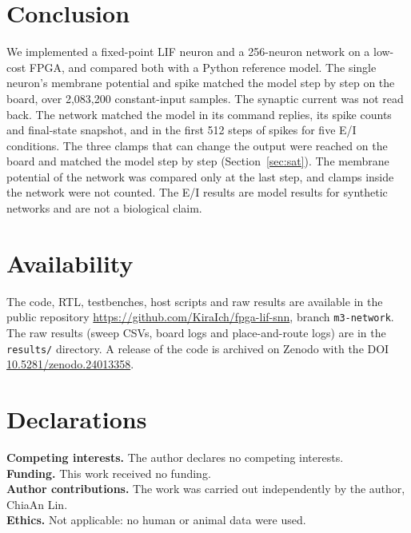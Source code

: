 \documentclass[11pt]{article}
\begin{document}
\section{Conclusion}
\label{sec:conclusion}
We implemented a fixed-point LIF neuron and a 256-neuron network on a low-cost FPGA, and compared both with a Python reference model.
The single neuron's membrane potential and spike matched the model step by step on the board, over 2,083,200 constant-input samples. The synaptic current was not read back.
The network matched the model in its command replies, its spike counts and final-state snapshot, and in the first 512 steps of spikes for five E/I conditions.
The three clamps that can change the output were reached on the board and matched the model step by step (Section~\ref{sec:sat}). The membrane potential of the network was compared only at the last step, and clamps inside the network were not counted.
The E/I results are model results for synthetic networks and are not a biological claim.

\section*{Availability}
The code, RTL, testbenches, host scripts and raw results are available in the public repository \url{https://github.com/KiraIch/fpga-lif-snn}, branch \texttt{m3-network}.
The raw results (sweep CSVs, board logs and place-and-route logs) are in the \texttt{results/} directory.
A release of the code is archived on Zenodo with the DOI \href{https://doi.org/10.5281/zenodo.24013358}{10.5281/zenodo.24013358}.

\section*{Declarations}
\textbf{Competing interests.} The author declares no competing interests.\\
\textbf{Funding.} This work received no funding.\\
\textbf{Author contributions.} The work was carried out independently by the author, ChiaAn Lin.\\
\textbf{Ethics.} Not applicable: no human or animal data were used.



\end{document}
